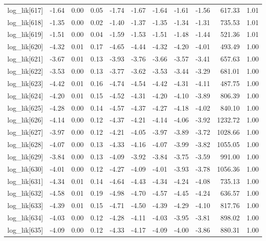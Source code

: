 \begin{table}[ht]
\begin{tabular}{rrrrrrrrrrr}
  log\_lik[617] & -1.64 & 0.00 & 0.05 & -1.74 & -1.67 & -1.64 & -1.61 & -1.56 & 617.33 & 1.01 \\ 
  log\_lik[618] & -1.35 & 0.00 & 0.02 & -1.40 & -1.37 & -1.35 & -1.34 & -1.31 & 735.53 & 1.01 \\ 
  log\_lik[619] & -1.51 & 0.00 & 0.04 & -1.59 & -1.53 & -1.51 & -1.48 & -1.44 & 521.36 & 1.01 \\ 
  log\_lik[620] & -4.32 & 0.01 & 0.17 & -4.65 & -4.44 & -4.32 & -4.20 & -4.01 & 493.49 & 1.00 \\ 
  log\_lik[621] & -3.67 & 0.01 & 0.13 & -3.93 & -3.76 & -3.66 & -3.57 & -3.41 & 657.63 & 1.00 \\ 
  log\_lik[622] & -3.53 & 0.00 & 0.13 & -3.77 & -3.62 & -3.53 & -3.44 & -3.29 & 681.01 & 1.00 \\ 
  log\_lik[623] & -4.42 & 0.01 & 0.16 & -4.74 & -4.54 & -4.42 & -4.31 & -4.11 & 487.75 & 1.00 \\ 
  log\_lik[624] & -4.20 & 0.01 & 0.15 & -4.52 & -4.31 & -4.20 & -4.10 & -3.89 & 806.39 & 1.00 \\ 
  log\_lik[625] & -4.28 & 0.00 & 0.14 & -4.57 & -4.37 & -4.27 & -4.18 & -4.02 & 840.10 & 1.00 \\ 
  log\_lik[626] & -4.14 & 0.00 & 0.12 & -4.37 & -4.21 & -4.14 & -4.06 & -3.92 & 1232.72 & 1.00 \\ 
  log\_lik[627] & -3.97 & 0.00 & 0.12 & -4.21 & -4.05 & -3.97 & -3.89 & -3.72 & 1028.66 & 1.00 \\ 
  log\_lik[628] & -4.07 & 0.00 & 0.13 & -4.33 & -4.16 & -4.07 & -3.99 & -3.82 & 1055.05 & 1.00 \\ 
  log\_lik[629] & -3.84 & 0.00 & 0.13 & -4.09 & -3.92 & -3.84 & -3.75 & -3.59 & 991.00 & 1.00 \\ 
  log\_lik[630] & -4.01 & 0.00 & 0.12 & -4.27 & -4.09 & -4.01 & -3.93 & -3.78 & 1056.36 & 1.00 \\ 
  log\_lik[631] & -4.34 & 0.01 & 0.14 & -4.64 & -4.43 & -4.34 & -4.24 & -4.08 & 735.13 & 1.00 \\ 
  log\_lik[632] & -4.58 & 0.01 & 0.19 & -4.98 & -4.70 & -4.57 & -4.45 & -4.24 & 636.57 & 1.00 \\ 
  log\_lik[633] & -4.39 & 0.01 & 0.15 & -4.71 & -4.50 & -4.39 & -4.29 & -4.10 & 817.76 & 1.00 \\ 
  log\_lik[634] & -4.03 & 0.00 & 0.12 & -4.28 & -4.11 & -4.03 & -3.95 & -3.81 & 898.02 & 1.00 \\ 
  log\_lik[635] & -4.09 & 0.00 & 0.12 & -4.33 & -4.17 & -4.09 & -4.00 & -3.86 & 880.31 & 1.00 \\ 

\end{tabular}
\end{table}
